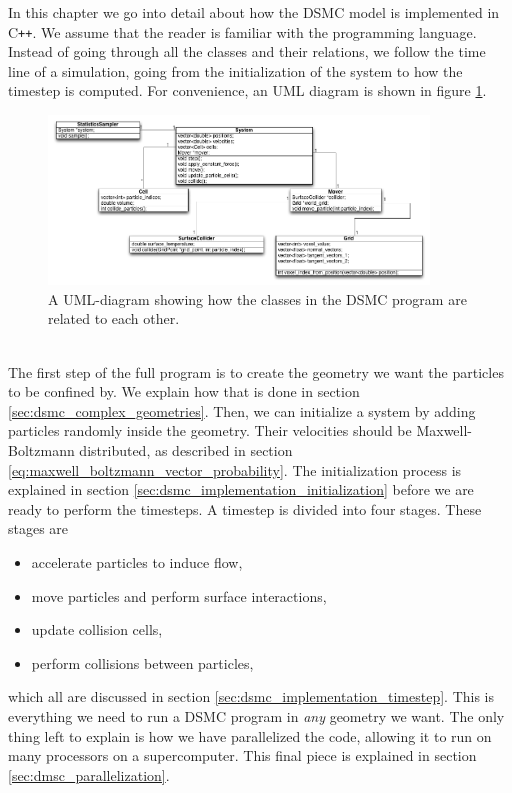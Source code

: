 In this chapter we go into detail about how the DSMC model is implemented in C{}\verb!++!. We assume that the reader is familiar with the programming language. Instead of going through all the classes and their relations, we follow the time line of a simulation, going from the initialization of the system to how the timestep is computed. For convenience, an UML diagram is shown in figure \ref{fig:dsmc_uml_diagram}.
\begin{figure}[h]
\begin{center}
\includegraphics[width=0.9\textwidth, trim=0cm 0cm 0cm 0cm, clip]{DSMC/figures/dsmcuml.png}
\end{center}
\caption{A UML-diagram showing how the classes in the DSMC program are related to each other.}
\label{fig:dsmc_uml_diagram}
\end{figure}
\\
The first step of the full program is to create the geometry we want the particles to be confined by. We explain how that is done in section \ref{sec:dsmc_complex_geometries}. Then, we can initialize a system by adding particles randomly inside the geometry. Their velocities should be Maxwell-Boltzmann distributed, as described in section \ref{eq:maxwell_boltzmann_vector_probability}. The initialization process is explained in section \ref{sec:dsmc_implementation_initialization} before we are ready to perform the timesteps. A timestep is divided into four stages. These stages are
\begin{itemize}
    \item accelerate particles to induce flow,
    \item move particles and perform surface interactions,
    \item update collision cells,
    \item perform collisions between particles,
\end{itemize}
which all are discussed in section \ref{sec:dsmc_implementation_timestep}. This is everything we need to run a DSMC program in \textit{any} geometry we want. The only thing left to explain is how we have parallelized the code, allowing it to run on many processors on a supercomputer. This final piece is explained in section \ref{sec:dmsc_parallelization}. 